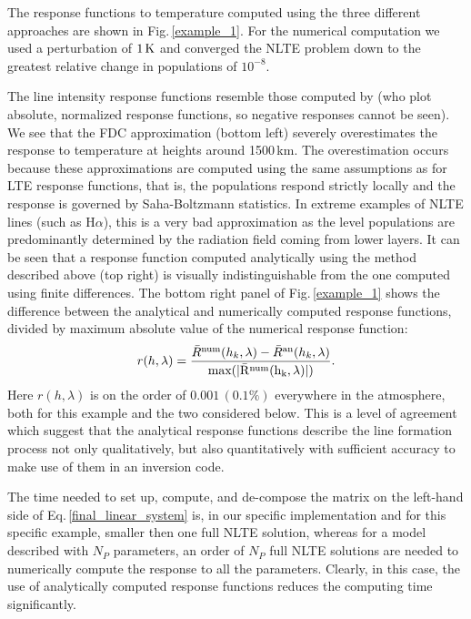\documentclass[referee]{aa}
\begin{document}
The response functions to temperature computed using the three different approaches are shown in Fig.\,\ref{example_1}. For the numerical computation we  used a perturbation of $1\,\rm{K}$ and converged the NLTE problem down to the greatest relative change in populations of $10^{-8}$. 

The line intensity response functions resemble those computed by \citet{Hector_halpha} (who  plot absolute, normalized response functions, so negative responses cannot be seen). We see that the FDC approximation (bottom left) severely overestimates the response to temperature at heights around 1500\,km. The overestimation occurs because these approximations are computed using the same assumptions as for LTE response functions, that is, the populations respond strictly locally and the response is governed by Saha-Boltzmann statistics. In extreme examples of NLTE lines (such as H$\alpha$), this is a very bad approximation as the level populations are predominantly determined by the radiation field coming from lower layers. It can be seen that a response function computed analytically using the method described above (top right) is visually indistinguishable from the one computed using finite differences. The bottom right panel of Fig.\,\ref{example_1} shows the difference between the analytical and numerically computed response functions, divided by maximum absolute value of the numerical response function:
\begin{equation}
r(h,\lambda) = \frac{\bar{R}^{\rm num}(h_k,\lambda) - \bar{R}^{\rm an}(h_k,\lambda)}{\rm max (|\bar{R}^{\rm num}(h_k,\lambda)|)}.
\end{equation}
Here $r(h,\lambda)$ is on the order of $0.001\,(0.1\%)$ everywhere in the atmosphere, both for this example and the two considered below. This is a level of agreement which suggest that the analytical response functions describe the line formation process not only qualitatively, but also quantitatively with sufficient accuracy to make use of them in an inversion code. 

 The time needed to set up, compute, and de-compose the matrix on the left-hand side of Eq.\,\ref{final_linear_system} is, in our specific implementation and for this specific example, smaller then one full NLTE solution, whereas for a model described with $N_P$ parameters,  an order of $N_P$ full NLTE solutions are needed to numerically compute the response to all the parameters. Clearly, in this case, the use of analytically computed response functions reduces the computing time significantly.
\end{document}
